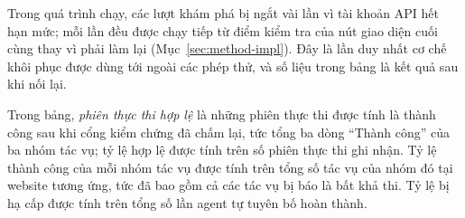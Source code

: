 Trong quá trình chạy, các lượt khám phá bị ngắt vài lần vì tài khoản API hết hạn mức; mỗi lần đều được chạy tiếp từ điểm kiểm tra của nút giao diện cuối cùng thay vì phải làm lại (Mục~\ref{sec:method-impl}). Đây là lần duy nhất cơ chế khôi phục được dùng tới ngoài các phép thử, và số liệu trong bảng là kết quả sau khi nối lại.

Trong bảng, \emph{phiên thực thi hợp lệ} là những phiên thực thi được tính là thành công sau khi cổng kiểm chứng đã chấm lại, tức tổng ba dòng ``Thành công'' của ba nhóm tác vụ; tỷ lệ hợp lệ được tính trên số phiên thực thi ghi nhận. Tỷ lệ thành công của mỗi nhóm tác vụ được tính trên tổng số tác vụ của nhóm đó tại website tương ứng, tức đã bao gồm cả các tác vụ bị báo là bất khả thi. Tỷ lệ bị hạ cấp được tính trên tổng số lần agent tự tuyên bố hoàn thành.

